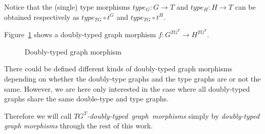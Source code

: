 Notice that the (single) type morphisms $type_G : G \rightarrow T$ and $type_H : H \rightarrow T$ can be obtained respectively as $type_{TG} \circ t^G$ and $type_{TG} \circ t^H$.

\begin{example} Figure~\ref{fig:process:doubly-typed-graph-morphism} shows a doubly-typed graph morphism $f : G^{TG^T} \rightarrow H^{TG^T}$.

\begin{figure}[!ht]
  \centering
  \caption{Doubly-typed graph morphism}\label{fig:process:doubly-typed-graph-morphism}
\end{figure}
\end{example}

\begin{remark} There could be defined different kinds of doubly-typed graph morphisms depending on whether the doubly-type graphs and the type graphs are or not the same. However, we are here only interested in the case where all doubly-typed graphs share the same double-type and type graphs.

Therefore we will call \mbox{\emph{$TG^T$-doubly-typed graph morphisms}} simply by \emph{doubly-typed graph morphisms} through the rest of this work.

\end{remark}


